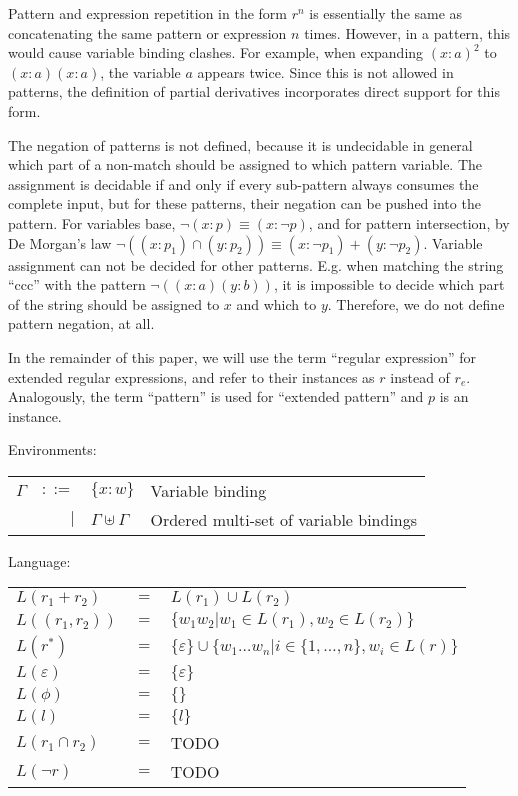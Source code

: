 Pattern and expression repetition in the form $r^n$ is essentially the same as
concatenating the same pattern or expression $n$ times. However, in a pattern,
this would cause variable binding clashes. For example, when expanding
$(x:a)^2$ to $(x:a)(x:a)$, the variable $a$ appears twice. Since this is not
allowed in patterns, the definition of partial derivatives incorporates direct
support for this form.

The negation of patterns is not defined, because it is undecidable in general
which part of a non-match should be assigned to which pattern variable. The
assignment is decidable if and only if every sub-pattern always consumes the
complete input, but for these patterns, their negation can be pushed into the
pattern. For variables base, $\neg(x:p) \equiv (x:\neg p)$, and for pattern
intersection, by De Morgan's law $\neg((x:p_1) \cap (y:p_2)) \equiv (x:\neg
p_1) + (y:\neg p_2)$. Variable assignment can not be decided for other
patterns. E.g. when matching the string ``ccc'' with the pattern
$\neg((x:a)(y:b))$, it is impossible to decide which part of the string should
be assigned to $x$ and which to $y$. Therefore, we do not define pattern
negation, at all.

In the remainder of this paper, we will use the term ``regular expression''
for extended regular expressions, and refer to their instances as $r$ instead
of $r_e$.  Analogously, the term ``pattern'' is used for ``extended pattern''
and $p$ is an instance.

Environments:

\begin{tabular}{lrll}
   $\Gamma$	& $::=$	& $\{x:w\}$			& Variable binding	\\
		& $|$	& $\Gamma \uplus \Gamma$	& Ordered multi-set of
							  variable bindings	\\
\end{tabular}

Language:

\begin{tabular}{lll}
   $L(r_1 + r_2)$	& $=$	& $L(r_1) \cup L(r_2)$					\\
   $L((r_1, r_2))$	& $=$	& $\{ w_1w_2 | w_1 \in L(r_1), w_2 \in L(r_2) \}$	\\
   $L(r^*)$		& $=$	&
      $\{\varepsilon\} \cup \{ w_1 \dots w_n | i
      \in \{ 1, \dots, n \}, w_i \in L(r) \}$	\\
   $L(\varepsilon)$	& $=$	& $\{\varepsilon\}$					\\
   $L(\phi)$		& $=$	& $\{\}$						\\
   $L(l)$		& $=$	& $\{l\}$						\\
   $L(r_1 \cap r_2)$	& $=$	& TODO					\\
   $L(\neg r)$		& $=$	& TODO					\\
\end{tabular}

